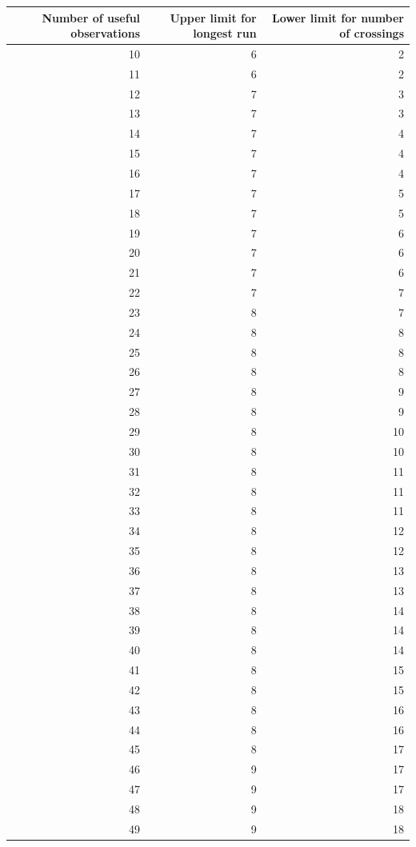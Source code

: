 \documentclass[
]{book}
\begin{document}
\begin{tabular}{r|r|r}
\hline
Number of useful observations & Upper limit for longest run & Lower limit for number of crossings\\
\hline
10 & 6 & 2\\
\hline
11 & 6 & 2\\
\hline
12 & 7 & 3\\
\hline
13 & 7 & 3\\
\hline
14 & 7 & 4\\
\hline
15 & 7 & 4\\
\hline
16 & 7 & 4\\
\hline
17 & 7 & 5\\
\hline
18 & 7 & 5\\
\hline
19 & 7 & 6\\
\hline
20 & 7 & 6\\
\hline
21 & 7 & 6\\
\hline
22 & 7 & 7\\
\hline
23 & 8 & 7\\
\hline
24 & 8 & 8\\
\hline
25 & 8 & 8\\
\hline
26 & 8 & 8\\
\hline
27 & 8 & 9\\
\hline
28 & 8 & 9\\
\hline
29 & 8 & 10\\
\hline
30 & 8 & 10\\
\hline
31 & 8 & 11\\
\hline
32 & 8 & 11\\
\hline
33 & 8 & 11\\
\hline
34 & 8 & 12\\
\hline
35 & 8 & 12\\
\hline
36 & 8 & 13\\
\hline
37 & 8 & 13\\
\hline
38 & 8 & 14\\
\hline
39 & 8 & 14\\
\hline
40 & 8 & 14\\
\hline
41 & 8 & 15\\
\hline
42 & 8 & 15\\
\hline
43 & 8 & 16\\
\hline
44 & 8 & 16\\
\hline
45 & 8 & 17\\
\hline
46 & 9 & 17\\
\hline
47 & 9 & 17\\
\hline
48 & 9 & 18\\
\hline
49 & 9 & 18\\

\end{tabular}
\end{document}
